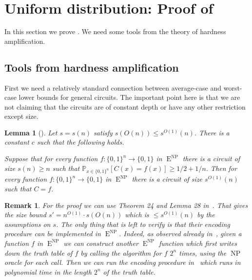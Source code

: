 \documentclass{toc}
\newtheorem{rem}[theorem]{Remark}   %
\newtheorem{lem}[theorem]{Lemma}  %
\DeclareMathOperator{\NP}{\mathrm{NP}}  %
\DeclareMathOperator{\EEE}{\mathrm{E}}  %
\newcommand{\zo}{\{0, 1\}}
\renewcommand{\P}{\mathbb{P}}
\begin{document}
\section{Uniform distribution: Proof of  \label{sec:Uniform-distribution:-Proof}}

In this section we prove . We need some
tools from the theory of hardness amplification.

\subsection{Tools from hardness amplification}

First we need a relatively standard connection between average-case
and worst-case lower bounds for general circuits. The important point
here is that we are not claiming that the circuits are of constant
depth or have any other restriction except size.

%
%
\begin{lem}[{\cite{BFNW93,Imp95,STV01}}]
\label{lem:STV} Let $s=s(n)$ satisfy $s(O(n))\le s^{O(1)}(n)$.
There is a constant $c$ such that the following holds.

Suppose that for every function $f:\zo^{n}\to\zo$ in $\EEE^{\NP}$ there
is a circuit of size $s(n)\ge n$ such that $\P_{x\in\zo^{n}}[C(x)=f(x)]\ge1/2+1/n$.
Then for every function $f:\zo^{n}\to\zo$ in $\EEE^{\NP}$ there is a
circuit of size $s^{O(1)}(n)$ such that $C=f$.
\end{lem}

\begin{rem}
For the proof we can use Theorem 24 and Lemma 28 in~\cite{STV01}.
That gives the size bound $s'=n^{O(1)}\cdot s(O(n))$ which is $\le s^{O(1)}(n)$
by the assumptions on $s$. The only thing that is left to verify
is that their encoding procedure can be implemented in $\EEE^{\NP}$.
Indeed, as observed already in~\cite{DBLP:conf/latin/ChenOS18}, given
a function $f$ in $\EEE^{\NP}$ we can construct another $\EEE^{\NP}$ function
which first writes down the truth table of $f$ by calling the algorithm
for $f$ $2^{n}$ times, using the $\NP$ oracle for each call. Then we
can run the encoding procedure in~\cite{STV01} which runs in polynomial
time in the length $2^{n}$ of the truth table.
\end{rem}
\end{document}
